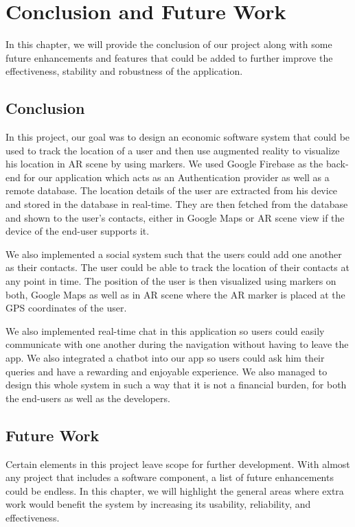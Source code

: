 \chapter{Conclusion and Future Work} 
\label{chap6}

In this chapter, we will provide the conclusion of our project along with some future enhancements and features that could be added to further improve the effectiveness, stability and robustness of the application.

\section{Conclusion}
In this project, our goal was to design an economic software system that could be used to track the location of a user and then use augmented reality to visualize his location in AR scene by using markers. We used Google Firebase as the back-end for our application which acts as an Authentication provider as well as a remote database. The location details of the user are extracted from his device and stored in the database in real-time. They are then fetched from the database and shown to the user's contacts, either in Google Maps or AR scene view if the device of the end-user supports it.

We also implemented a social system such that the users could add one another as their contacts. The user could be able to track the location of their contacts at any point in time. The position of the user is then visualized using markers on both, Google Maps as well as in AR scene where the AR marker is placed at the GPS coordinates of the user. 

We also implemented real-time chat in this application so users could easily communicate with one another during the navigation without having to leave the app. We also integrated a chatbot into our app so users could ask him their queries and have a rewarding and enjoyable experience. We also managed to design this whole system in such a way that it is not a financial burden, for both the end-users as well as the developers.


\section{Future Work}
Certain elements in this project leave scope for further development. With almost any project that includes a software component, a list of future enhancements could be endless. In this chapter, we will highlight the general areas where extra work would benefit the system by increasing its usability, reliability, and effectiveness.

